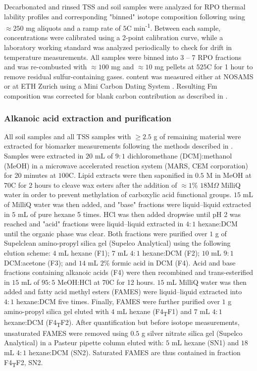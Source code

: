 Decarbonated and rinsed TSS and soil samples were analyzed for RPO thermal lability profiles and corresponding "binned" isotope composition following \citet{Hemingway:2016rc} using $\approx 250$ mg aliquots and a ramp rate of $5$\textdegree C min\textsuperscript{-1}. Between each sample,  concentrations were calibrated using a 2-point calibration curve, while a laboratory working standard was analyzed periodically to check for drift in temperature measurements. All samples were binned into 3 -- 7 RPO fractions and  was re-combusted with $\approx 100$ mg  and $\approx 10$ mg  pellets at $525$\textdegree C for 1 hour to remove residual sulfur-containing gases.   content was measured either at NOSAMS or at ETH Zurich using a Mini Carbon Dating System \citep[Micadas;][]{McNichol:1994ty,Christl:2013ks}. Resulting Fm composition was corrected for blank carbon contribution as described in \citet{Hemingway:2016rc}.

\subsubsection{Alkanoic acid extraction and purification}

All soil samples and all TSS samples with $\geq 2.5$ g of remaining material were extracted for biomarker measurements following the methods described in \citet{Hemingway:2016bq}. Samples were extracted in $20$ mL of $9:1$ dichloromethane (DCM):methanol (MeOH) in a microwave accelerated reaction system (MARS, CEM corporation) for 20 minutes at $100$\textdegree C. Lipid extracts were then saponified in $0.5$ M  in MeOH at $70$\textdegree C for 2 hours to cleave wax esters after the addition of $\approx 1$\% $18$M$\Omega$ MilliQ water in order to prevent methylation of carboxylic acid functional groups. $15$ mL of MilliQ water was then added, and "base" fractions were liquid--liquid extracted in $5$ mL of pure hexane 5 times. HCl was then added dropwise until pH 2 was reached and "acid" fractions were liquid--liquid extracted in $4:1$ hexane:DCM until the organic phase was clear. Both fractions were purified over $1$ g of Supelclean amino-propyl silica gel (Supelco Analytical) using the following elution scheme: $4$ mL hexane (F1); $7$ mL $4:1$ hexane:DCM (F2); $10$ mL $9:1$ DCM:acetone (F3); and $14$ mL $2$\% formic acid in DCM (F4). Acid and base fractions containing alkanoic acids (F4) were then recombined and trans-esterified in $15$ mL of $95:5$ MeOH:HCl at $70$\textdegree C for 12 hours. $15$ mL MilliQ water was then added and fatty acid methyl esters (FAMES) were liquid--liquid extracted into $4:1$ hexane:DCM five times. Finally, FAMES were further purified over $1$ g amino-propyl silica gel eluted with $4$ mL hexane (F4\textsubscript{T}F1) and $7$ mL $4:1$ hexane:DCM (F4\textsubscript{T}F2). After quantification but before isotope measurements, unsaturated FAMES were removed using $0.5$ g silver nitrate silica gel (Supelco Analytical) in a Pasteur pipette column eluted with: $5$ mL hexane (SN1) and $18$ mL $4:1$ hexane:DCM (SN2). Saturated FAMES are thus contained in fraction F4\textsubscript{T}F2, SN2.

